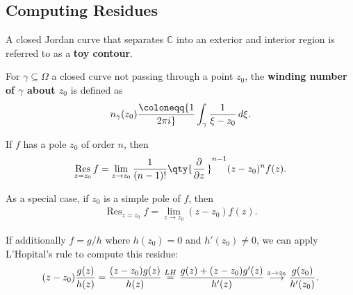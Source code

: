 \hypertarget{computing-residues}{%
\subsection{Computing Residues}\label{computing-residues}}

\begin{definition}

A closed Jordan curve that separates \({\mathbb{C}}\) into an exterior
and interior region is referred to as a \textbf{toy contour}.

\end{definition}

\begin{definition}

For \(\gamma \subseteq \Omega\) a closed curve not passing through a
point \(z_0\), the \textbf{winding number of \(\gamma\) about \(z_0\)}
is defined as
\begin{align*}
n_\gamma(z_0) \coloneqq{1\over 2\pi i} \int_\gamma {1\over \xi -z_0}\,d\xi
.\end{align*}

\end{definition}

\begin{proposition}

If \(f\) has a pole \(z_0\) of order \(n\), then
\begin{align*}  
\mathop{\mathrm{Res}}_{z=z_0} f = \lim_{z\to z_0} {1 \over (n-1)!} \qty{{\frac{\partial }{\partial z}\,}}^{n-1} (z-z_0)^n f(z)
.\end{align*}

\end{proposition}

\begin{proposition}

As a special case, if \(z_0\) is a simple pole of \(f\), then
\begin{align*}  
\mathop{\mathrm{Res}}_{z=z_0}f = \lim_{z\to z_0} (z-z_0) f(z)
.\end{align*}

\end{proposition}

\begin{corollary}

If additionally \(f=g/h\) where \(h(z_0) = 0\) and \(h'(z_0)\neq 0\), we
can apply L'Hopital's rule to compute this residue:
\begin{align*}
(z-z_0) {g(z) \over h(z)} = {(z-z_0) g(z) \over h(z) } \overset{LH}{=}
{g(z) + (z-z_0) g'(z) \over h'(z)} \overset{z\to z_0}\longrightarrow{g(z_0) \over h'(z_0)}
.\end{align*}

\end{corollary}

